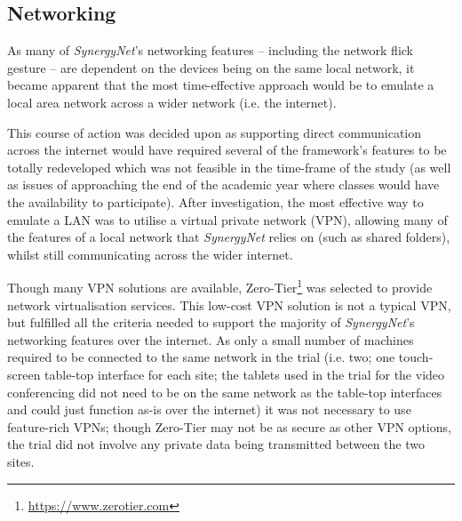 \documentclass[a4paper,11pt]{article}
\begin{document}
\subsection{Networking}

As many of {\emph{SynergyNet}}’s networking features -- including the network flick gesture -- are dependent on the devices being on the same local network, it became apparent that the most time-effective approach would be to emulate a local area network across a wider network (i.e. the internet).

This course of action was decided upon as supporting direct communication across the internet would have required several of the framework’s features to be totally redeveloped which was not feasible in the time-frame of the study (as well as issues of approaching the end of the academic year where classes would have the availability to participate).
After investigation, the most effective way to emulate a LAN was to utilise a virtual private network (VPN), allowing many of the features of a local network that {\emph{SynergyNet}} relies on (such as shared folders), whilst still communicating across the wider internet.

Though many VPN solutions are available, Zero-Tier\footnote{\url{https://www.zerotier.com}} was selected to provide network virtualisation services.
This low-cost VPN solution is not a typical VPN, but fulfilled all the criteria needed to support the majority of {\emph{SynergyNet}}’s networking features over the internet.
As only a small number of machines required to be connected to the same network in the trial (i.e. two; one touch-screen table-top interface for each site; the tablets used in the trial for the video conferencing did not need to be on the same network as the table-top interfaces and could just function as-is over the internet) it was not necessary to use feature-rich VPNs; though Zero-Tier may not be as secure as other VPN options, the trial did not involve any private data being transmitted between the two sites.
\end{document}
